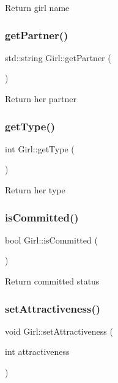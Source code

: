 Return girl name \mbox{\label{class_girl_a532906e2a807138de027b2a822e91abd}} 
\subsubsection{\texorpdfstring{get\+Partner()}{getPartner()}}
{\footnotesize\ttfamily std\+::string Girl\+::get\+Partner (\begin{DoxyParamCaption}{ }\end{DoxyParamCaption})}

Return her partner \mbox{\label{class_girl_acd2e75d7212ce1223945c6befff293b8}} 
\subsubsection{\texorpdfstring{get\+Type()}{getType()}}
{\footnotesize\ttfamily int Girl\+::get\+Type (\begin{DoxyParamCaption}{ }\end{DoxyParamCaption})}

Return her type \mbox{\label{class_girl_ac4768f02f66b1d124fa7da9c0d85a078}} 
\subsubsection{\texorpdfstring{is\+Committed()}{isCommitted()}}
{\footnotesize\ttfamily bool Girl\+::is\+Committed (\begin{DoxyParamCaption}{ }\end{DoxyParamCaption})}

Return committed status \mbox{\label{class_girl_a8b94b6e5b0ebe961040e1c1033832588}} 
\subsubsection{\texorpdfstring{set\+Attractiveness()}{setAttractiveness()}}
{\footnotesize\ttfamily void Girl\+::set\+Attractiveness (\begin{DoxyParamCaption}\item[{int}]{attractiveness }\end{DoxyParamCaption})}

